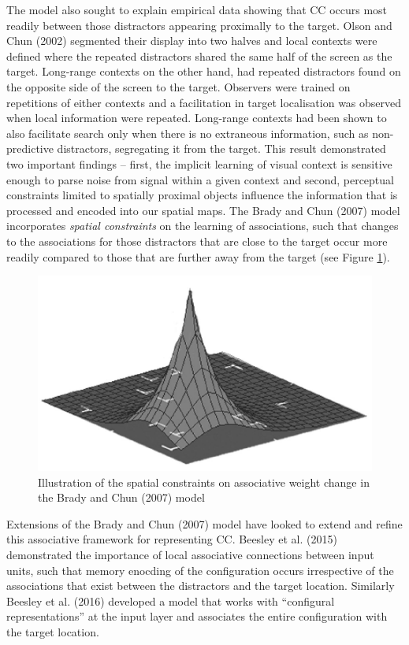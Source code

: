 \documentclass[
  man,floatsintext]{apa7}
\begin{document}
The model also sought to explain empirical data showing that CC occurs most readily between those distractors appearing proximally to the target. Olson and Chun (2002) segmented their display into two halves and local contexts were defined where the repeated distractors shared the same half of the screen as the target. Long-range contexts on the other hand, had repeated distractors found on the opposite side of the screen to the target. Observers were trained on repetitions of either contexts and a facilitation in target localisation was observed when local information were repeated. Long-range contexts had been shown to also facilitate search only when there is no extraneous information, such as non-predictive distractors, segregating it from the target. This result demonstrated two important findings -- first, the implicit learning of visual context is sensitive enough to parse noise from signal within a given context and second, perceptual constraints limited to spatially proximal objects influence the information that is processed and encoded into our spatial maps. The Brady and Chun (2007) model incorporates \emph{spatial constraints} on the learning of associations, such that changes to the associations for those distractors that are close to the target occur more readily compared to those that are further away from the target (see Figure \ref{fig:brady2007}).



\begin{figure}

{\centering \includegraphics[width=0.6\linewidth]{fig_Brady2007_SC} 

}

\caption{Illustration of the spatial constraints on associative weight change in the Brady and Chun (2007) model}\label{fig:brady2007}
\end{figure}

Extensions of the Brady and Chun (2007) model have looked to extend and refine this associative framework for representing CC. Beesley et al. (2015) demonstrated the importance of local associative connections between input units, such that memory enocding of the configuration occurs irrespective of the associations that exist between the distractors and the target location. Similarly Beesley et al. (2016) developed a model that works with ``configural representations'' at the input layer and associates the entire configuration with the target location.
\end{document}
